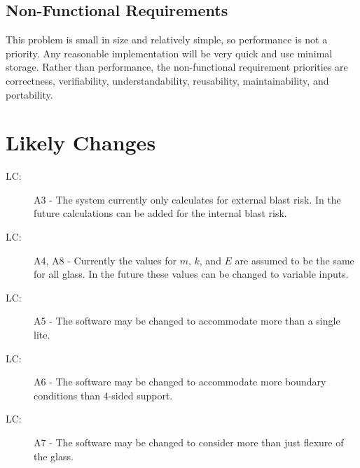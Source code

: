 \documentclass[12pt]{article}
\newcounter{lcnum}
\newcommand{\lcthelcnum}{LC\thelcnum}
\begin{document}
\subsection{Non-Functional Requirements}
\label{Sec:Non-Requ}
This problem is small in size and relatively simple, so performance is not a priority. Any reasonable implementation will be very quick and use minimal storage. Rather than performance, the non-functional requirement priorities are correctness, verifiability, understandability, reusability, maintainability, and portability.
\section{Likely Changes}
\label{Sec:LikeChan}
\begin{description}
\item[\lcthelcnum\label{LC:s8likelychg1}:]A3 - The system currently only calculates for external blast risk. In the future calculations can be added for the internal blast risk.
\end{description}
\begin{description}
\item[\lcthelcnum\label{LC:s8likelychg2}:]A4, A8 - Currently the values for $m$, $k$, and $E$ are assumed to be the same for all glass. In the future these values can be changed to variable inputs.
\end{description}
\begin{description}
\item[\lcthelcnum\label{LC:s8likelychg3}:]A5 - The software may be changed to accommodate more than a single lite.
\end{description}
\begin{description}
\item[\lcthelcnum\label{LC:s8likelychg4}:]A6 - The software may be changed to accommodate more boundary conditions than 4-sided support.
\end{description}
\begin{description}
\item[\lcthelcnum\label{LC:s8likelychg5}:]A7 - The software may be changed to consider more than just flexure of the glass.
\end{description}
\end{document}
